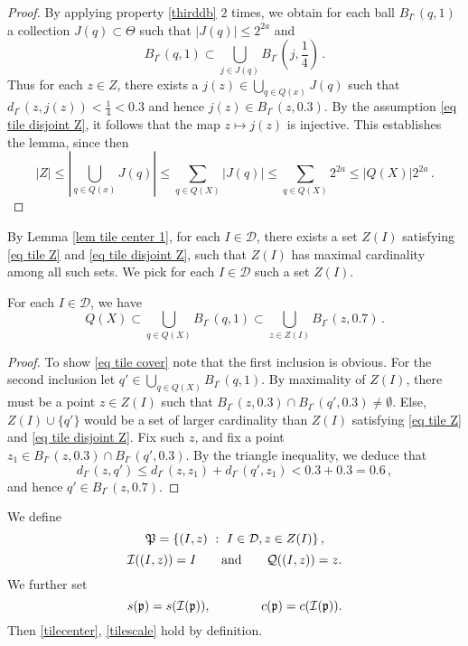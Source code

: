 \begin{proof}
    By applying property \eqref{thirddb}  $2$ times, we obtain for each ball $B_{I^\circ}(q,1)$ a collection $J(q) \subset \Theta$ such that $|J(q)| \le 2^{2a}$ and
    $$
        B_{I^\circ}(q,1) \subset \bigcup_{j \in J(q)} B_{I^\circ{}}(j, \frac{1}{4})\,.
    $$
    Thus for each $z \in Z$, there exists a $j(z) \in \bigcup_{q \in Q(x)} J(q)$ such that $d_{I^\circ}(z,j(z)) < \frac{1}{4} <0.3$ and hence $j(z) \in B_{I^\circ}(z, 0.3)$. By the assumption \eqref{eq tile disjoint Z}, it follows that the map $z \mapsto j(z)$ is injective. This establishes the lemma, since then
    $$
        |Z| \le |\bigcup_{q \in Q(x)} J(q)| \le \sum_{q \in Q(X)}|J(q)| \le \sum_{q \in Q(X)} 2^{2a} \le |Q(X)|2^{2a}\,.
    $$
\end{proof}

By Lemma \ref{lem tile center 1}, for each $I \in \mathcal{D}$, there exists a set $Z(I)$ satisfying \eqref{eq tile Z} and \eqref{eq tile disjoint Z}, such that $Z(I)$ has maximal cardinality among all such sets. We pick for each $I \in \mathcal{D}$ such a set $Z(I)$.

\begin{lemma}
    For each $I \in \mathcal{D}$, we have
    \begin{equation}
        \label{eq tile cover}
        Q(X) \subset  \bigcup_{q \in Q(X)} B_{I^\circ}(q, 1) \subset \bigcup_{z \in Z(I)} B_{I^\circ}(z, 0.7)\,.
    \end{equation}
\end{lemma}

\begin{proof}
    To show \eqref{eq tile cover} note that the first inclusion is obvious. For the second inclusion let $q' \in  \bigcup_{q \in Q(X)} B_{I^\circ}(q, 1)$. By maximality of $Z(I)$, there must be a point $z \in Z(I)$ such that $B_{I^\circ}(z, 0.3) \cap B_{I^\circ}(q', 0.3) \ne \emptyset$. Else, $Z(I) \cup \{q'\}$ would be a set of larger cardinality than $Z(I)$ satisfying \eqref{eq tile Z} and \eqref{eq tile disjoint Z}. Fix such $z$, and fix a point $z_1 \in B_{I^\circ}(z, 0.3) \cap B_{I^\circ}(q', 0.3)$. By the triangle inequality, we deduce that
    $$
        d_{I^\circ}(z,q') \le d_{I^\circ}(z,z_1) + d_{I^\circ}(q', z_1) < 0.3 + 0.3 = 0.6\,,
    $$
    and hence $q' \in B_{I^\circ}(z, 0.7)$.
\end{proof}

We define
$$
    \mathfrak P = \{(I, z) \ : \ I \in \mathcal{D}, z \in Z(I)\}\,,
$$
$$\mathcal{I}((I, z)) = I\qquad \text{and} \qquad \mathcal{Q}((I, z)) = z.$$ We further set $$s(\mathfrak p) = s(\mathcal{I}(\mathfrak p)),\qquad \qquad c(\mathfrak p) = c(\mathcal{I}(\mathfrak p)).$$ Then \eqref{tilecenter}, \eqref{tilescale} hold by definition.

